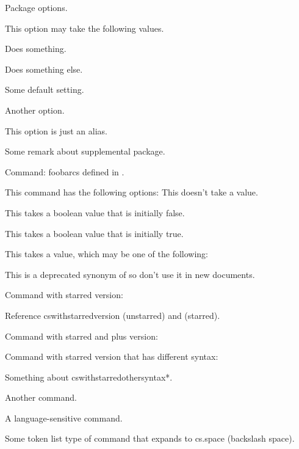 \documentclass[titlepage=false,oneside,
 fontsize=12pt,captions=tableheading]{scrbook}
\begin{document}

Package options.

This option may take the following values.

Does something.

Does something else.

Some default setting.

Another option.

This option is just an alias.

Some remark about supplemental package.

Command: \gls{foobarcs} defined in .


This command has the following options:
This doesn't take a value.

This takes a boolean value that is initially false.

This takes a boolean value that is initially true.

This takes a value, which may be one of the following:


This is a deprecated synonym of
 so don't use it in new
documents.

Command with starred version:

Reference \gls{cswithstarredversion} (unstarred) and
 (starred).

Command with starred and plus version:


Command with starred version that has different syntax:


Something about \gls{cswithstarredothersyntax*}.

Another command.

A language-sensitive command.

Some token list type of command that expands to \gls{cs.space}
(backslash space).
\end{document}
